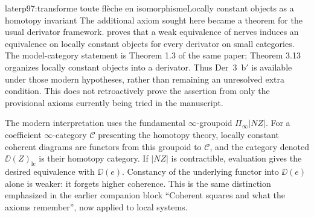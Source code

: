 \begin{dcomment}{later}{p97:transforme toute flèche en isomorphisme}{Locally constant objects as a homotopy invariant}
The additional axiom sought here became a theorem for the usual derivator framework. \citet[Corollary 3.8]{Cisinski2009LocallyConstant} proves that a weak equivalence of nerves induces an equivalence on locally constant objects for every derivator on small categories. The model-category statement is Theorem 1.3 of the same paper; Theorem 3.13 organizes locally constant objects into a derivator. Thus Der~3~b$'$ is available under those modern hypotheses, rather than remaining an unresolved extra condition. This does not retroactively prove the assertion from only the provisional axioms currently being tried in the manuscript.

The modern interpretation uses the fundamental $\infty$-groupoid $\Pi_\infty|NZ|$. For a coefficient $\infty$-category $\mathcal C$ presenting the homotopy theory, locally constant coherent diagrams are functors from this groupoid to $\mathcal C$, and the category denoted $\DD(Z)_{\mathrm{lc}}$ is their homotopy category. If $|NZ|$ is contractible, evaluation gives the desired equivalence with $\DD(e)$. Constancy of the underlying functor into $\DD(e)$ alone is weaker: it forgets higher coherence. This is the same distinction emphasized in the earlier companion block ``Coherent squares and what the axioms remember'', now applied to local systems.
\end{dcomment}

